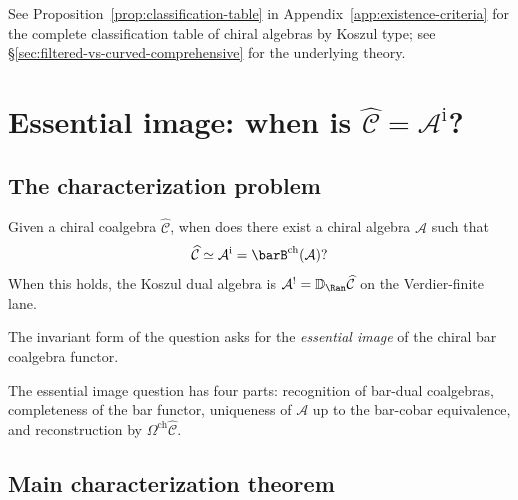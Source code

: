 See Proposition~\ref{prop:classification-table} in Appendix~\ref{app:existence-criteria} for the complete classification table of chiral algebras by Koszul type; see \S\ref{sec:filtered-vs-curved-comprehensive} for the underlying theory.


\section{\texorpdfstring{Essential image: when is $\widehat{\mathcal{C}} = \mathcal{A}^{\mathrm i}$?}{Essential image: when is C = A i?}}
\label{sec:essential-image-koszul}

\subsection{The characterization problem}

\begin{question}\label{q:inverse-problem-koszul}
Given a chiral coalgebra $\widehat{\mathcal{C}}$, when does there
exist a chiral algebra $\mathcal{A}$ such that
\[
\widehat{\mathcal{C}}\simeq\mathcal{A}^{\mathrm i}
=\barB^{\mathrm{ch}}(\mathcal{A})?
\]
When this holds, the Koszul dual algebra is
$\mathcal{A}^{!}=\mathbb{D}_{\Ran}\widehat{\mathcal{C}}$ on the
Verdier-finite lane.

The invariant form of the question asks for the \emph{essential image}
of the chiral bar coalgebra functor.
\end{question}

\begin{remark}\label{rem:why-essential-image-matters}
The essential image question has four parts: recognition of bar-dual
coalgebras, completeness of the bar functor, uniqueness of
$\mathcal{A}$ up to the bar-cobar equivalence, and reconstruction by
$\Omega^{\mathrm{ch}}\widehat{\mathcal{C}}$.
\end{remark}

\subsection{Main characterization theorem}

